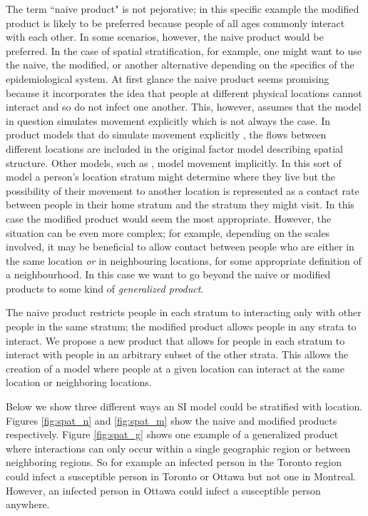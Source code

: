 \documentclass[referee,sn-basic]{sn-jnl}%
\theoremstyle{definition}
\newcommand{\define}[1]{\emph{{#1}}}
\begin{document}
The term “naive product" is not pejorative; in this specific example the modified product is likely to be preferred because people of all ages commonly interact with each other. In some scenarios, however, the naive product would be preferred. In the case of spatial stratification, for example, one might want to use the naive, the modified, or another alternative depending on the specifics of the epidemiological system. At first glance the naive product seems promising because it incorporates the idea that people at different physical locations cannot interact and so do not infect one another. This, however, assumes that the model in question simulates movement explicitly which is not always the case. In product models that do simulate movement explicitly \cite[e.g.][]{mohammadi2023importation}, the flows between different locations are included in the original factor model describing spatial structure. Other models, such as \cite{dietz1995structured}, model movement implicitly. In this sort of model a person's location stratum might determine where they live but the possibility of their movement to another location is represented as a contact rate between people in their home stratum and the stratum they might visit. In this case the modified product would seem the most appropriate. However, the situation can be even more complex; for example, depending on the scales involved, it may be beneficial to allow contact between people who are either in the same location \emph{or} in neighbouring locations, for some appropriate definition of a neighbourhood. In this case we want to go beyond the naive or modified products to some kind of \define{generalized product}.


The naive product restricts people in each stratum to interacting only with other people in the same stratum; the modified product allows people in any strata to interact. We propose a new product that allows for people in each stratum to interact with people in an arbitrary subset of the other strata. This allows the creation of a model where people at a given location can interact at the same location or neighboring locations. 



Below we show three different ways an SI model could be stratified with location. Figures \ref{fig:spat_n} and \ref{fig:spat_m} show the naive and modified products respectively. Figure \ref{fig:spat_g} shows one example of a generalized product where interactions can only occur within a single geographic region or between neighboring regions. So for example an infected person in the Toronto region could infect a susceptible person in Toronto or Ottawa but not one in Montreal. However, an infected person in Ottawa could infect a susceptible person anywhere. 
\end{document}
